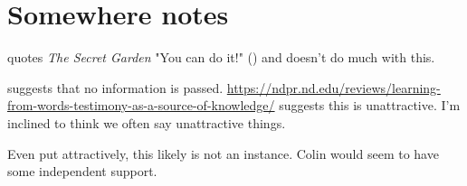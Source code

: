 \documentclass[10pt]{article}
\begin{document}
\section{Somewhere notes}
\label{sec:somewhere-notes}

\begin{note}
  \citeauthor{Lackey:2008aa} quotes \emph{The Secret Garden} "You can do it!" (\citeyear[22]{Lackey:2008aa}) and doesn't do much with this.

  \citeauthor{Lackey:2008aa} suggests that no information is passed.
  \url{https://ndpr.nd.edu/reviews/learning-from-words-testimony-as-a-source-of-knowledge/} suggests this is unattractive.
  I'm inclined to think we often say unattractive things.

  Even put attractively, this likely is not an instance.
  Colin would seem to have some independent support.
\end{note}
\end{document}
